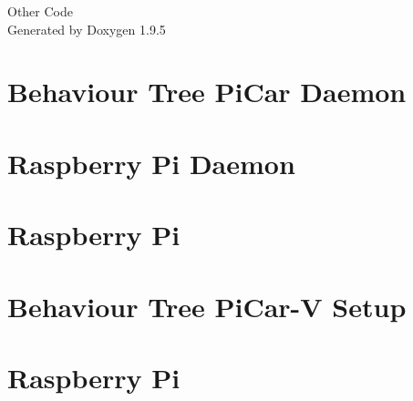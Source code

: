 \documentclass[twoside]{book}
\newcommand{\+}{\discretionary{\mbox{\scriptsize$\hookleftarrow$}}{}{}}
\newcommand{\clearemptydoublepage}{%
    \newpage{\pagestyle{empty}\cleardoublepage}%
  }
\begin{document}
  \raggedbottom
    \hypersetup{pageanchor=false,
                bookmarksnumbered=true,
                pdfencoding=unicode
               }
  \begin{titlepage}
  \vspace*{7cm}
  \begin{center}%
  {\Large Other Code}\\
  \vspace*{1cm}
  {\large Generated by Doxygen 1.9.5}\\
  \end{center}
  \end{titlepage}
  \clearemptydoublepage
  \tableofcontents
  \clearemptydoublepage
  \hypersetup{pageanchor=true}
\chapter{Behaviour Tree Pi\+Car Daemon}
\label{md__github_workspace_app_rpi_daemon_install_README}

\chapter{Raspberry Pi Daemon}
\label{md__github_workspace_app_rpi_daemon_README}

\chapter{Raspberry Pi}
\label{md__github_workspace_app_rpi_README}

\chapter{Behaviour Tree Pi\+Car-\/V Setup}
\label{md__github_workspace_app_rpi_SETUP}

\chapter{Raspberry Pi}
\label{md__github_workspace_app_rpi_tui_README}

\end{document}

